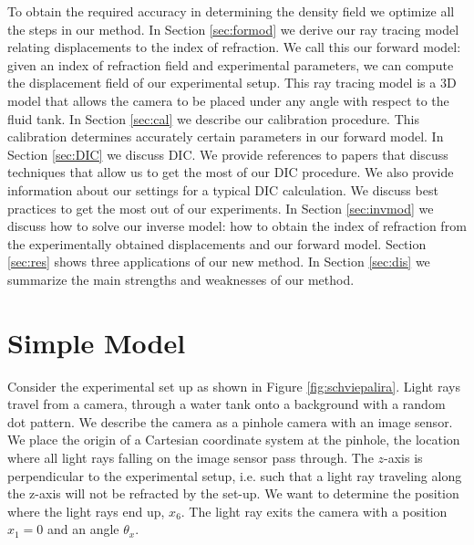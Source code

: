 \documentclass{svjour3}                     %
\begin{document}
To obtain the required accuracy in determining the density field we optimize all the steps in our method.  In Section \ref{sec:formod} we derive our ray tracing model relating displacements to the index of refraction. We call this our forward model: given an index of refraction field and experimental parameters, we can compute the displacement field of our experimental setup. This ray tracing model is a 3D model that allows the camera to be placed under any angle with respect to the fluid tank. In Section \ref{sec:cal} we describe our calibration procedure. This calibration determines accurately certain parameters in our forward model.  In Section \ref{sec:DIC} we discuss DIC. We provide references to papers that discuss techniques that allow us to get the most of our DIC procedure. We also provide information about our settings for a typical DIC calculation. We discuss best practices to get the most out of our experiments. In Section \ref{sec:invmod} we discuss how to solve our inverse model: how to obtain the index of refraction from the experimentally obtained displacements and our forward model. Section \ref{sec:res} shows three applications of our new method. In Section \ref{sec:dis} we summarize the main strengths and weaknesses of our method.

\section{Simple Model}
\label{sec:simmod}
Consider the experimental set up as shown in Figure \ref{fig:schviepalira}. Light rays travel from a camera, through a water tank onto a background with a random dot pattern.  We describe the camera as a pinhole camera with an image sensor. We place the origin of a Cartesian coordinate system at the pinhole, the location where all light rays falling on the image sensor pass through. The $z$-axis is perpendicular to the experimental setup, i.e. such that a light ray traveling along the z-axis will not be refracted by the set-up. We want to determine the position where the light rays end up, $x_6$. The light ray exits the camera with a position $x_1 = 0$ and an angle $\theta_x$. %

%	
\end{document}
